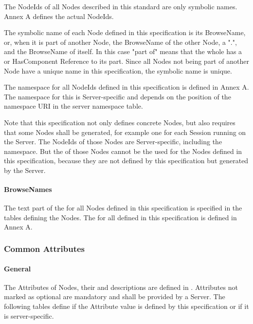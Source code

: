 The \glspl{NodeId} of all \glspl{Node} described in this standard are only symbolic names. Annex A defines the actual \glspl{NodeId}.

The symbolic name of each \gls{Node} defined in this specification is its \gls{BrowseName}, or, when it is part of another Node, the \gls{BrowseName} of the other \gls{Node}, a ".", and the \gls{BrowseName} of itself. In this case "part of" means that the whole has a  or \gls{HasComponent} Reference to its part. Since all \glspl{Node} not being part of another \gls{Node} have a unique name in this specification, the symbolic name is unique.

The namespace for all \glspl{NodeId} defined in this specification is defined in Annex A. The namespace for this  is Server-specific and depends on the position of the namespace URI in the server namespace table.

Note that this specification not only defines concrete \glspl{Node}, but also requires that some Nodes shall be generated, for example one for each Session running on the Server. The \glspl{NodeId} of those \glspl{Node} are Server-specific, including the namespace. But the  of those \glspl{Node} cannot be the  used for the Nodes defined in this specification, because they are not defined by this specification but generated by the Server.

\paragraph{BrowseNames}
The text part of the  for all \gls{Node}s defined in this specification is specified in the tables defining the Nodes. The  for all  defined in this specification is defined in Annex A.

\subsubsection{Common Attributes}

\paragraph{General}
The \glspl{Attribute} of \glspl{Node}, their  and descriptions are defined in \cite{UAPart3}. \glspl{Attribute} not marked as optional are mandatory and shall be provided by a Server. The following tables define if the \gls{Attribute} value is defined by this specification or if it is server-specific.

